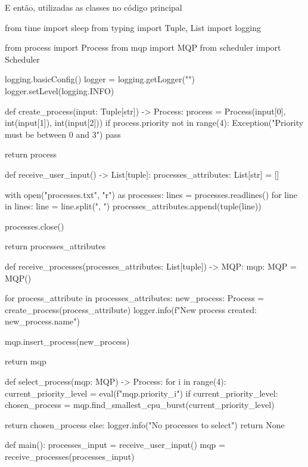     E então, utilizadas as classes no código principal
    \begin{python}
    from time import sleep
    from typing import Tuple, List 
    import logging

    from process import Process
    from mqp import MQP
    from scheduler import Scheduler

    logging.basicConfig()
    logger = logging.getLogger("")
    logger.setLevel(logging.INFO)


    def create_process(input: Tuple[str]) -> Process:
            process = Process(input[0], int(input[1]), int(input[2]))
            if process.priority not in range(4):
                Exception("Priority must be between 0 and 3")
                pass

            return process


    def receive_user_input() -> List[tuple]:
        processes_attributes: List[str] = []

        with open("processes.txt", "r") as processes:
            lines = processes.readlines()
            for line in lines:
                line = line.split(", ")
                processes_attributes.append(tuple(line))

            processes.close()

        return processes_attributes

        
    def receive_processes(processes_attributes: List[tuple]) -> MQP:
        mqp: MQP = MQP()
        
        for process_attribute in processes_attributes:
            new_process: Process = create_process(process_attribute)
            logger.info(f"New process created: {new_process.name}")

            mqp.insert_process(new_process)

        return mqp



    def select_process(mqp: MQP) -> Process:
        for i in range(4):
            current_priority_level = eval(f"mqp.priority_{i}")
            if current_priority_level:
                chosen_process = mqp.find_smallest_cpu_burst(current_priority_level)
        
                return chosen_process
        else:
            logger.info("No processes to select")
            return None


    def main():
        processes_input = receive_user_input()
        mqp = receive_processes(processes_input)


\end{python}
